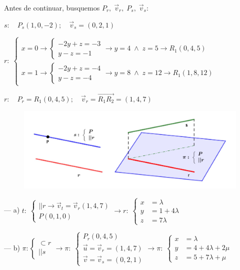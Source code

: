 \begin{proofw}\renewcommand{\qedsymbol}{$\diamond$}

Antes de continuar, busquemos $P_r, \;\vec v_r, \;P_s, \;\vec v_s$:

$s:\quad P_s(1,0,-2); \quad \vec v_s=(0,2,1)$

\noindent $r:\; \begin{cases}
x=0 \to \begin{cases} -2y+z=-3\\y-z=-1 \end{cases} \to y=4 	\;\wedge\; z=5 \to R_1(0,4,5)\\
x=1 \to \begin{cases} -2y+z=-4\\y-z=-4 \end{cases} \to y=8 	\;\wedge\; z=12 \to R_1(1,8,12)
 \end{cases}$
 
$r:\quad P_r=R_1(0,4,5); \quad \vec v_r=\overrightarrow{R_1R_2} =(1,4,7)$
 
	\begin{figure}[H]
		\centering
		\includegraphics[width=1\textwidth]{imagenes/imagenes10/T10IM22.png}
 	\end{figure}
 	
 \noindent --- a) $t:\; \begin{cases} ||r\to \vec v_t=\vec v_r(1,4,7) \\ P(0,1,0) \end{cases} \to r:\; \begin{cases} x&=\lambda\\y&=1+4\lambda\\z&=7\lambda \end{cases}$
 
 \noindent --- b) $\pi: \begin{cases} \subset r \\ || s \end{cases} \to \pi:\; \begin{cases} P_r(0,4,5)\\ \vec u=\vec v_r=(1,4,7)\\ \vec v= \vec v_s=(0,2,1) \end{cases} \to \pi:\; \begin{cases} x&=\lambda \\ y&=4+4\lambda+2\mu \\ z&= 5+7\lambda+\mu \end{cases}$
 	
\end{proofw}



